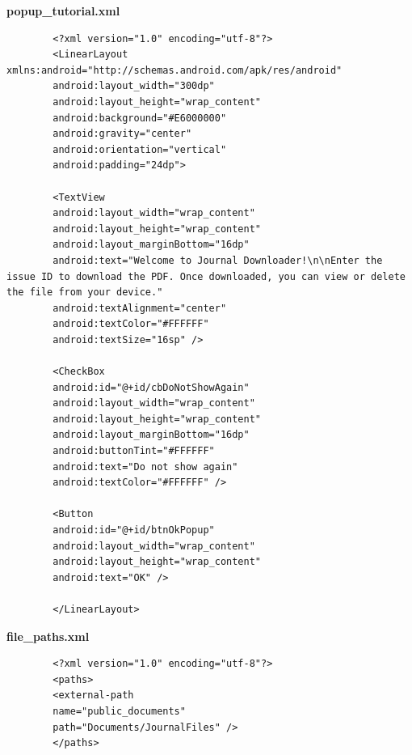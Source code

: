 \documentclass[14pt, a4paper]{extreport}
\begin{document}
	\textbf{popup\_tutorial.xml}
	
	\begin{verbatim} 
		<?xml version="1.0" encoding="utf-8"?>
		<LinearLayout xmlns:android="http://schemas.android.com/apk/res/android"
		android:layout_width="300dp"
		android:layout_height="wrap_content"
		android:background="#E6000000"
		android:gravity="center"
		android:orientation="vertical"
		android:padding="24dp">
		
		<TextView
		android:layout_width="wrap_content"
		android:layout_height="wrap_content"
		android:layout_marginBottom="16dp"
		android:text="Welcome to Journal Downloader!\n\nEnter the issue ID to download the PDF. Once downloaded, you can view or delete the file from your device."
		android:textAlignment="center"
		android:textColor="#FFFFFF"
		android:textSize="16sp" />
		
		<CheckBox
		android:id="@+id/cbDoNotShowAgain"
		android:layout_width="wrap_content"
		android:layout_height="wrap_content"
		android:layout_marginBottom="16dp"
		android:buttonTint="#FFFFFF"
		android:text="Do not show again"
		android:textColor="#FFFFFF" />
		
		<Button
		android:id="@+id/btnOkPopup"
		android:layout_width="wrap_content"
		android:layout_height="wrap_content"
		android:text="OK" />
		
		</LinearLayout>
	\end{verbatim}
	
	\textbf{file\_paths.xml}
	
	\begin{verbatim} 
		<?xml version="1.0" encoding="utf-8"?>
		<paths>
		<external-path
		name="public_documents"
		path="Documents/JournalFiles" />
		</paths>
	\end{verbatim}
\end{document}
